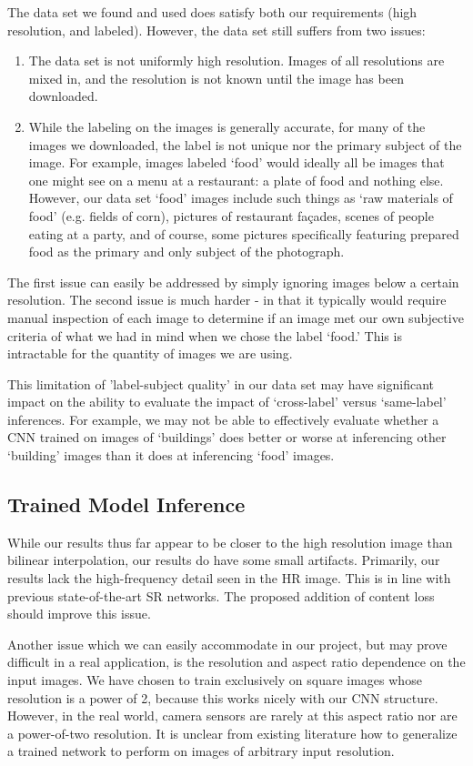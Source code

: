 \documentclass{article}
\begin{document}
The data set we found and used does satisfy both our requirements (high resolution, and labeled). However, the data set still suffers from two issues: 
\begin{enumerate}
    \item The data set is not uniformly high resolution. Images of all resolutions are mixed in, and the resolution is not known until the image has been downloaded. 
    \item While the labeling on the images is generally accurate, for many of the images we downloaded, the label is not unique nor the primary subject of the image. For example, images labeled `food' would ideally all be images that one might see on a menu at a restaurant: a plate of food and nothing else. However, our data set `food' images include such things as `raw materials of food' (e.g. fields of corn), pictures of restaurant fa\c{c}ades, scenes of people eating at a party, and of course, some pictures specifically featuring prepared food as the primary and only subject of the photograph.
\end{enumerate}
The first issue can easily be addressed by simply ignoring images below a certain resolution. The second issue is much harder - in that it typically would require manual inspection of each image to determine if an image met our own subjective criteria of what we had in mind when we chose the label `food.' This is intractable for the quantity of images we are using.

This limitation of 'label-subject quality' in our data set may have significant impact on the ability to evaluate the impact of `cross-label' versus `same-label' inferences. For example, we may not be able to effectively evaluate whether a CNN trained on images of `buildings' does better or worse at inferencing other `building' images than it does at inferencing `food' images.

\subsection{Trained Model Inference}
While our results thus far appear to be closer to the high resolution image than bilinear interpolation, our results do have some small artifacts. Primarily, our results lack the high-frequency detail seen in the HR image. This is in line with previous state-of-the-art SR  networks. The proposed addition of content loss should improve this issue.

Another issue which we can easily accommodate in our project, but may prove difficult in a real application, is the resolution and aspect ratio dependence on the input images. We have chosen to train exclusively on square images whose resolution is a power of 2, because this works nicely with our CNN structure. However, in the real world, camera sensors are rarely at this aspect ratio nor are a power-of-two resolution. It is unclear from existing literature how to generalize a trained network to perform on images of arbitrary input resolution.
\end{document}
